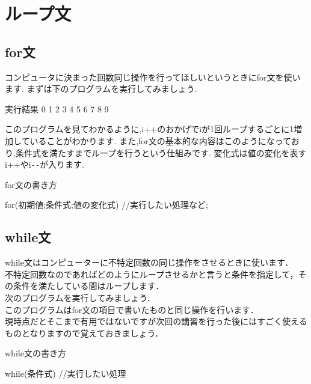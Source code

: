 ﻿\section{ループ文}
\subsection{for文}
 コンピュータに決まった回数同じ操作を行ってほしいというときにfor文を使います.
まずは下のプログラムを実行してみましょう.




\begin{itembox}{実行結果}
0 1 2 3 4 5 6 7 8 9

\end{itembox}
このプログラムを見てわかるように,i++のおかげでiが1回ループするごとに1増加していることがわかります.
また,for文の基本的な内容はこのようになっており,条件式を満たすまでループを行うという仕組みです.
変化式は値の変化を表すi++やi\verb"--"が入ります.

\begin{itembox}{for文の書き方}
\begin{verbatimtab}
for(初期値;条件式;値の変化式){ 
	//実行したい処理など;
}
\end{verbatimtab}
\end{itembox}
\subsection{while文}
while文はコンピューターに不特定回数の同じ操作をさせるときに使います．\\
不特定回数なのであればどのようにループさせるかと言うと条件を指定して，その条件を満たしている間はループします．\\
次のプログラムを実行してみましょう．\\

このプログラムはfor文の項目で書いたものと同じ操作を行います．\\
現時点だとそこまで有用ではないですが次回の講習を行った後にはすごく使えるものとなりますので覚えておきましょう．\\
\begin{itembox}{while文の書き方}
\begin{verbatimtab}
while(条件式){
		//実行したい処理
}
\end{verbatimtab}
\end{itembox}

